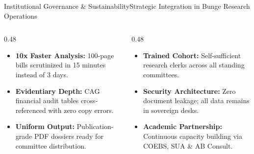 \documentclass[aspectratio=169, 10pt]{beamer}
\begin{document}
\begin{frame}{Institutional Governance \& Sustainability}{Strategic Integration in Bunge Research Operations}
  \begin{columns}[c]
    \begin{column}{0.48\textwidth}
      \begin{tcolorbox}[colback=lightgrey, colframe=tanzaniablue, arc=1.5mm, boxrule=0.8pt, title=\textbf{Immediate Institutional Impact}]
        \small
        \begin{itemize}
          \item \textbf{\textcolor{tanzaniablue}{10x Faster Analysis:}} 100-page bills scrutinized in 15 minutes instead of 3 days.
          \item \textbf{\textcolor{suagreen}{Evidentiary Depth:}} CAG financial audit tables cross-referenced with zero copy errors.
          \item \textbf{\textcolor{darkcharcoal}{Uniform Output:}} Publication-grade PDF dossiers ready for committee distribution.
        \end{itemize}
      \end{tcolorbox}
    \end{column}
    \begin{column}{0.48\textwidth}
      \begin{tcolorbox}[colback=calloutbg, colframe=suagreen, arc=1.5mm, boxrule=0.8pt, title=\textbf{Long-Term Institutionalization}]
        \small
        \begin{itemize}
          \item \textbf{\textcolor{suagreen}{Trained Cohort:}} Self-sufficient research clerks across all standing committees.
          \item \textbf{\textcolor{tanzaniablue}{Security Architecture:}} Zero document leakage; all data remains in sovereign desks.
          \item \textbf{\textcolor{darkcharcoal}{Academic Partnership:}} Continuous capacity building via COEBS, SUA \& AB Consult.
        \end{itemize}
      \end{tcolorbox}
    \end{column}
  \end{columns}
\end{frame}
\end{document}
